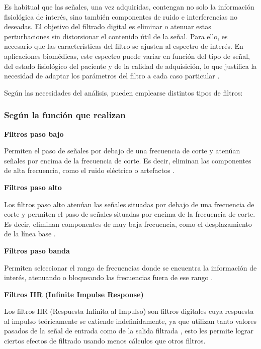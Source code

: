 Es habitual que las señales, una vez adquiridas, contengan no solo la información fisiológica de interés, sino también componentes de ruido e interferencias no deseadas. El objetivo del filtrado digital es eliminar o atenuar estas perturbaciones sin distorsionar el contenido útil de la señal. Para ello, es necesario que las características del filtro se ajusten al espectro de interés. En aplicaciones biomédicas, este espectro puede variar en función del tipo de señal, del estado fisiológico del paciente y de la calidad de adquisición, lo que justifica la necesidad de adaptar los parámetros del filtro a cada caso particular \cite{studysmarter_filtro_biosenales}.

Según las necesidades del análisis, pueden emplearse distintos tipos de filtros:

\subsubsection{Según la función que realizan}

\textbf{Filtros paso bajo}

Permiten el paso de señales por debajo de una frecuencia de corte y atenúan señales por encima de la frecuencia de corte. Es decir, eliminan las componentes de alta frecuencia, como el ruido eléctrico o artefactos \cite{mathworks_lowpass_filter}.

\textbf{Filtros paso alto}

Los filtros paso alto atenúan las señales situadas por debajo de una frecuencia de corte y permiten el paso de señales situadas por encima de la frecuencia de corte. Es decir, eliminan componentes de muy baja frecuencia, como el desplazamiento de la línea base \cite{mathworks_highpass_filter}.

\textbf{Filtros paso banda}

Permiten seleccionar el rango de frecuencias donde se encuentra la información de interés, atenuando o bloqueando las frecuencias fuera de ese rango \cite{rubia2021diseno}.

\textbf{Filtros IIR (Infinite Impulse Response) }

Los filtros IIR (Respuesta Infinita al Impulso) son filtros digitales cuya respuesta al impulso teóricamente se extiende indefinidamente, ya que utilizan tanto valores pasados de la señal de entrada como de la salida filtrada \cite{gonzalez2014filtrado}, esto les permite lograr ciertos efectos de filtrado usando menos cálculos que otros filtros.

